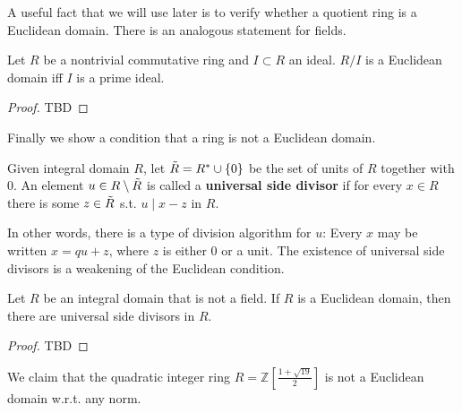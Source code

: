   A useful fact that we will use later is to verify whether a quotient ring is a Euclidean domain. There is an analogous statement for fields. 

  \begin{theorem}
    Let $R$ be a nontrivial commutative ring and $I \subset R$ an ideal. $R/I$ is a Euclidean domain iff $I$ is a prime ideal. 
  \end{theorem}
  \begin{proof}
    TBD
  \end{proof}

  Finally we show a condition that a ring is not a Euclidean domain. 

  \begin{definition}
    Given integral domain $R$, let $\Tilde{R} = R^\ast \cup \{0\}$ be the set of units of $R$ together with $0$. An element $u \in R \setminus \Tilde{R}$ is called a \textbf{universal side divisor} if for every $x \in R$ there is some $z \in \Tilde{R}$ s.t. $u \mid x - z$ in $R$. 
  \end{definition}

  In other words, there is a type of division algorithm for $u$: Every $x$ may be written $x = qu + z$, where $z$ is either $0$ or a unit. The existence of universal side divisors is a weakening of the Euclidean condition. 

  \begin{theorem}
    Let $R$ be an integral domain that is not a field. If $R$ is a Euclidean domain, then there are universal side divisors in $R$. 
  \end{theorem}
  \begin{proof}
    TBD
  \end{proof}

  \begin{example}[]
    We claim that the quadratic integer ring $R = \mathbb{Z}[\frac{1 + \sqrt{19}}{2}]$ is not a Euclidean domain w.r.t. any norm. 
  \end{example}
